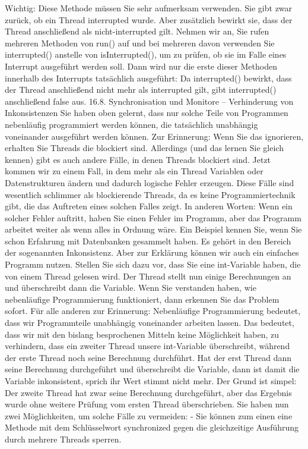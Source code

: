 Wichtig: Diese Methode müssen Sie sehr aufmerksam verwenden. Sie gibt zwar zurück, ob ein Thread interrupted wurde. Aber zusätzlich bewirkt sie, dass der Thread anschließend als nicht-interrupted gilt. Nehmen wir an, Sie rufen mehreren Methoden von run() auf und bei mehreren davon verwenden Sie interrupted() anstelle von isInterrupted(), um zu prüfen, ob sie im Falle eines Interrupt ausgeführt werden soll. Dann wird nur die erste dieser Methoden innerhalb des Interrupts tatsächlich ausgeführt: Da interrupted() bewirkt, dass der Thread anschließend nicht mehr als interrupted gilt, gibt interrupted() anschließend false aus.
16.8.	Synchronisation und Monitore – Verhinderung von Inkonsistenzen
Sie haben oben gelernt, dass nur solche Teile von Programmen nebenläufig programmiert werden können, die tatsächlich unabhängig voneinander ausgeführt werden können. Zur Erinnerung: Wenn Sie das ignorieren, erhalten Sie Threads die blockiert sind. Allerdings (und das lernen Sie gleich kennen) gibt es auch andere Fälle, in denen Threads blockiert sind.
Jetzt kommen wir zu einem Fall, in dem mehr als ein Thread Variablen oder Datenstrukturen ändern und dadurch logische Fehler erzeugen. Diese Fälle sind wesentlich schlimmer als blockierende Threads, da es keine Programmiertechnik gibt, die das Auftreten eines solchen Falles zeigt. In anderen Worten: Wenn ein solcher Fehler auftritt, haben Sie einen Fehler im Programm, aber das Programm arbeitet weiter als wenn alles in Ordnung wäre.
Ein Beispiel kennen Sie, wenn Sie schon Erfahrung mit Datenbanken gesammelt haben. Es gehört in den Bereich der sogenannten Inkonsistenz. Aber zur Erklärung können wir auch ein einfaches Programm nutzen. Stellen Sie sich dazu vor, dass Sie eine int-Variable haben, die von einem Thread gelesen wird. Der Thread stellt nun einige Berechnungen an und überschreibt dann die Variable.
Wenn Sie verstanden haben, wie nebenläufige Programmierung funktioniert, dann erkennen Sie das Problem sofort. Für alle anderen zur Erinnerung: Nebenläufige Programmierung bedeutet, dass wir Programmteile unabhängig voneinander arbeiten lassen. Das bedeutet, dass wir mit den bislang besprochenen Mitteln keine Möglichkeit haben, zu verhindern, dass ein zweiter Thread unsere int-Variable überschreibt, während der erste Thread noch seine Berechnung durchführt. Hat der erst Thread dann seine Berechnung durchgeführt und überschreibt die Variable, dann ist damit die Variable inkonsistent, sprich ihr Wert stimmt nicht mehr. Der Grund ist simpel: Der zweite Thread hat zwar seine Berechnung durchgeführt, aber das Ergebnis wurde ohne weitere Prüfung vom ersten Thread überschrieben.
Sie haben nun zwei Möglichkeiten, um solche Fälle zu vermeiden: 
-	Sie können zum einen eine Methode mit dem Schlüsselwort synchronized gegen die gleichzeitige Ausführung durch mehrere Threads sperren.

